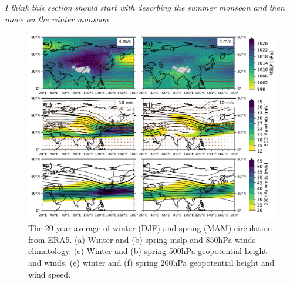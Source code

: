 \emph{I think this section should start with descrbing the summer monsoon and then move on the winter monsoon.}

\begin{figure}[htpb]
    \centering
    \includegraphics[width=\textwidth]{texfiles/figs/climatology_1999-2019.pdf}
    \caption{The 20 year average of winter (DJF)  and spring (MAM) circulation from ERA5. (a) Winter and (b) spring \acrshort{mslp} and 850hPa winds climatology. (c) Winter and (b) spring 500hPa geopotential height and winds. (e) winter and (f) spring 200hPa geopotential height and wind speed.}
    \label{fig:clim_circulation}
\end{figure}
